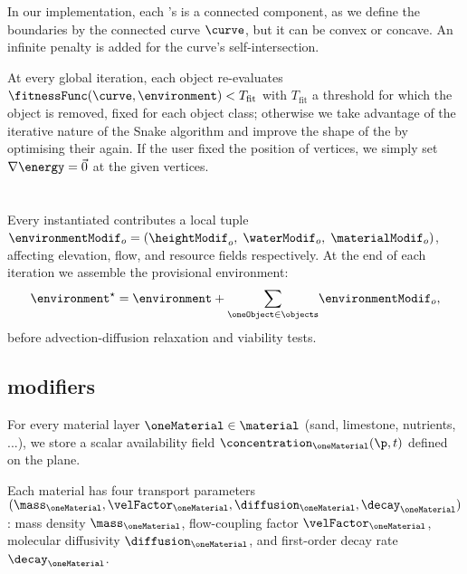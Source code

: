 In our implementation, each 's  is a connected component, as we define the boundaries by the connected curve $\curve$, but it can be convex or concave. An infinite penalty is added for the curve's self-intersection.

At every global iteration, each object re-evaluates $\fitnessFunc(\curve, \environment) < T_{\text{fit}}$ with $T_{\text{fit}}$ a threshold for which the object is removed, fixed for each object class; otherwise we take advantage of the iterative nature of the Snake algorithm and improve the shape of the  by optimising their  again. If the user fixed the position of vertices, we simply set $\nabla \energy = \vec{0}$ at the given vertices. %

\section{}
\label{sec:env-obj-materials}

Every instantiated  contributes a local  tuple $\environmentModif_o=(\heightModif_o, \;\waterModif_o, \;\materialModif_o)$, affecting elevation, flow, and resource fields respectively. At the end of each iteration we assemble the provisional environment:
\begin{align}
    \environment^{\star} = \environment + {\sum_{\oneObject\in\objects}}\environmentModif_o,
\end{align}
before advection-diffusion relaxation and viability tests.

\subsection{ modifiers}
\label{sec:env-obj-material-modifiers}
For every material layer $\oneMaterial \in \material$ (sand, limestone, nutrients, ...), we store a scalar availability field $\concentration_\oneMaterial(\p,t)$ defined on the plane. %

Each material has four transport parameters $(\mass_\oneMaterial, \velFactor_\oneMaterial, \diffusion_\oneMaterial, \decay_\oneMaterial)$: mass density $\mass_\oneMaterial$, flow-coupling factor $\velFactor_\oneMaterial$, molecular diffusivity $\diffusion_\oneMaterial$, and first-order decay rate $\decay_\oneMaterial$.

